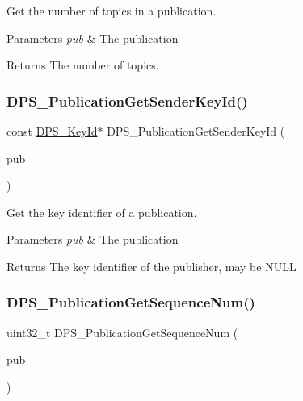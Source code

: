 Get the number of topics in a publication. 


\begin{DoxyParams}{Parameters}
{\em pub} & The publication\\
\hline
\end{DoxyParams}
\begin{DoxyReturn}{Returns}
The number of topics. 
\end{DoxyReturn}
\mbox{\label{group__publication_ga1d7e81c2f0b19736a4f7a7195e5bd98d}} 
\subsubsection{\texorpdfstring{D\+P\+S\+\_\+\+Publication\+Get\+Sender\+Key\+Id()}{DPS\_PublicationGetSenderKeyId()}}
{\footnotesize\ttfamily const \hyperlink{group__keystore_ga4345e29dd2ad5d7fd88a1e988787bd72}{D\+P\+S\+\_\+\+Key\+Id}$\ast$ D\+P\+S\+\_\+\+Publication\+Get\+Sender\+Key\+Id (\begin{DoxyParamCaption}\item[{const \hyperlink{group__publication_ga0d439693474aa54e27f3d45a054696ac}{D\+P\+S\+\_\+\+Publication} $\ast$}]{pub }\end{DoxyParamCaption})}



Get the key identifier of a publication. 


\begin{DoxyParams}{Parameters}
{\em pub} & The publication\\
\hline
\end{DoxyParams}
\begin{DoxyReturn}{Returns}
The key identifier of the publisher, may be N\+U\+LL 
\end{DoxyReturn}
\mbox{\label{group__publication_ga875b48217d861d4a9fa5471419d354e9}} 
\subsubsection{\texorpdfstring{D\+P\+S\+\_\+\+Publication\+Get\+Sequence\+Num()}{DPS\_PublicationGetSequenceNum()}}
{\footnotesize\ttfamily uint32\+\_\+t D\+P\+S\+\_\+\+Publication\+Get\+Sequence\+Num (\begin{DoxyParamCaption}\item[{const \hyperlink{group__publication_ga0d439693474aa54e27f3d45a054696ac}{D\+P\+S\+\_\+\+Publication} $\ast$}]{pub }\end{DoxyParamCaption})}



